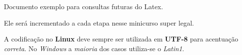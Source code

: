 \documentclass{article}
\begin{document}
	Documento exemplo para consultas futuras do Latex.
	
	Ele será incrementado a cada etapa nesse minicurso super legal.
	
	A codificação no \textbf{Linux} deve \huge sempre \normalsize ser utilizada em \textbf{UTF-8} para acentuação \emph{correta}. No \textit{Windows} a \emph{maioria} dos casos utiliza-se o \textit{Latin1}.
\end{document}

